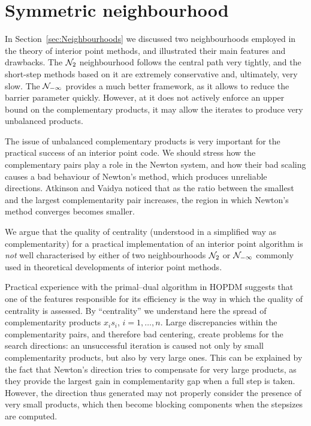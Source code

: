 %
%
\section{Symmetric neighbourhood}
\label{sec:SymNeighbourhood}

In Section~\ref{sec:Neighbourhoods} we discussed two neighbourhoods
employed in the theory of interior point methods, 
and illustrated their main features and drawbacks.
The $\mathcal{N}_2$ neighbourhood follows the central path very tightly, 
and the short-step methods
based on it are extremely conservative and, ultimately, very slow.
The $\mathcal{N}_{-\infty}$ provides a much better framework, as it allows to
reduce the barrier parameter quickly. However, at it does not actively
enforce an upper bound on the complementary products, it may allow the
iterates to produce very unbalanced products.

The issue of unbalanced complementary products is very important for
the practical success of an interior point code. 
We should stress how
the complementary pairs play a role in the Newton system, and how
their bad scaling causes a bad behaviour of Newton's method, which
produces unreliable directions.
Atkinson and Vaidya \cite{AtkinsonVaidya} noticed that as the ratio 
between the smallest and the largest complementarity pair
increases, the region in which Newton's method converges becomes smaller.


We argue that the quality of centrality 
(understood in a simplified way as complementarity)
for a practical implementation of an interior point algorithm
is {\it not} well characterised by either of two neighbourhoods 
$\mathcal{N}_2$ or $\mathcal{N}_{-\infty}$ commonly used in theoretical developments 
of interior point methods.

Practical experience with the primal--dual algorithm in HOPDM \cite{HOPDM}
suggests that one of the features responsible 
for its efficiency is the way in which the quality of centrality 
is assessed. By ``centrality'' we understand here the spread 
of complementarity products $x_i s_i$, $i = 1,\dots,n$.
Large discrepancies within the complementarity 
pairs, and therefore bad centering, create problems for the search 
directions: an unsuccessful iteration is caused not only by small
complementarity products, but also by very large ones.
%
 This can be explained by the fact that
Newton's direction tries to compensate for very 
large products, as they provide the largest gain in complementarity 
gap when a full step is taken. However, the direction thus generated 
may not properly consider the presence of very small products, 
which then become blocking components when the stepsizes are computed.


